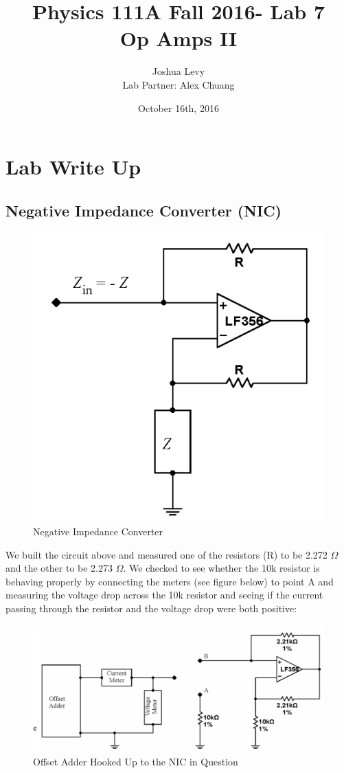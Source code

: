 \documentclass{article}
\title{Physics 111A Fall 2016- Lab 7\\
Op Amps II}
\author{Joshua Levy\\Lab Partner: Alex Chuang}
\date{October 16th, 2016}
\begin{document}
\maketitle

\section{Lab Write Up}
    \subsection{Negative Impedance Converter (NIC)}
    \begin{figure}[H]
        \centering
        \includegraphics[scale = 0.6]{1.png}
        \caption{Negative Impedance Converter \cite{lab7}}
        \label{fig:my_label}
    \end{figure}
    We built the circuit above and measured one of the resistors (R) to be 2.272 $\Omega$ and the other to be 2.273 $\Omega$. We checked to see whether the 10k resistor is behaving properly by connecting the meters (see figure below) to point A and measuring the voltage drop across the 10k resistor and seeing if the current passing through the resistor and the voltage drop were both positive:
    \begin{figure}[H]
        \centering
        \includegraphics[scale = 0.6]{1a.png}
        \caption{Offset Adder Hooked Up to the NIC in Question  \cite{lab7}}
        \label{fig:my_label}
    \end{figure}
\end{document}
